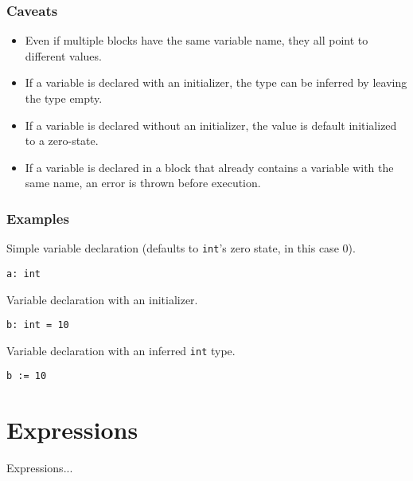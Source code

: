 \subsubsection{Caveats}

\begin{itemize}
    \item Even if multiple blocks have the same variable name, they all point to different values.
    \item If a variable is declared with an initializer, the type can be inferred by leaving the type empty.
    \item If a variable is declared without an initializer, the value is default initialized to a zero-state.
    \item If a variable is declared in a block that already contains a variable with the same name, an error is thrown before execution.
\end{itemize}

\subsubsection{Examples}

Simple variable declaration (defaults to \texttt{int}'s zero state, in this case 0).
\begin{lstlisting}
a: int
\end{lstlisting}
Variable declaration with an initializer.
\begin{lstlisting}
b: int = 10
\end{lstlisting}
Variable declaration with an inferred \texttt{int} type.
\begin{lstlisting}
b := 10
\end{lstlisting}

\section{Expressions}

Expressions...

